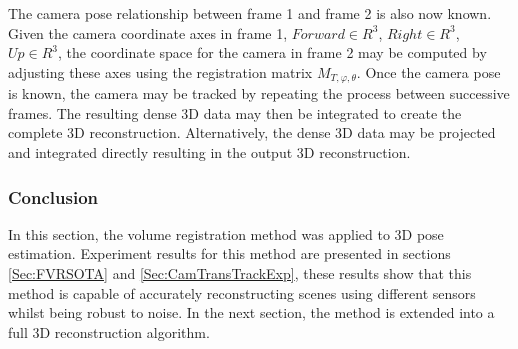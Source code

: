 The camera pose relationship between frame 1 and frame 2 is also now known. Given the camera coordinate axes in frame 1, $Forward \in R^3$, $Right \in R^3$, $Up \in R^3$, the coordinate space for the camera in frame 2 may be computed by adjusting these axes using the registration matrix $M_{T,\varphi,\theta}$. Once the camera pose is known, the camera may be tracked by repeating the process between successive frames. The resulting dense 3D data may then be integrated to create the complete 3D reconstruction. Alternatively, the dense 3D data may be projected and integrated directly resulting in the output 3D reconstruction. \\

\subsubsection{Conclusion}

In this section, the volume registration method was applied to 3D pose estimation. Experiment results for this method are presented in sections \ref{Sec:FVRSOTA} and \ref{Sec:CamTransTrackExp}, these results show that this method is capable of accurately reconstructing scenes using different sensors whilst being robust to noise. In the next section, the method is extended into a full 3D reconstruction algorithm.
